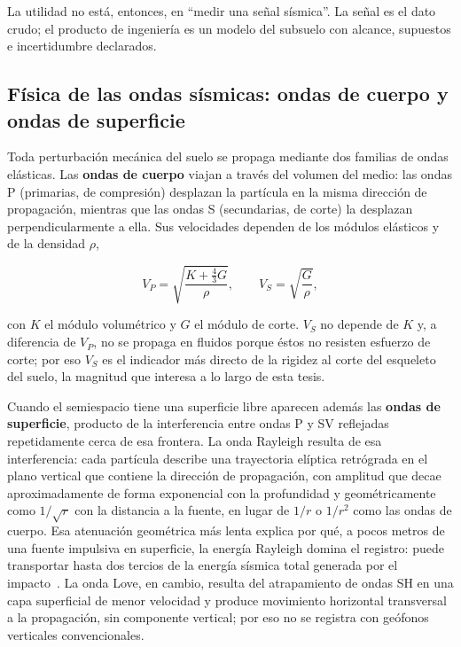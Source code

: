 La utilidad no está, entonces, en ``medir una señal sísmica''. La señal es el dato
crudo; el producto de ingeniería es un modelo del subsuelo con alcance, supuestos e
incertidumbre declarados.

\subsection{Física de las ondas sísmicas: ondas de cuerpo y ondas de superficie}

Toda perturbación mecánica del suelo se propaga mediante dos familias de ondas
elásticas. Las \textbf{ondas de cuerpo} viajan a través del volumen del medio: las ondas
P (primarias, de compresión) desplazan la partícula en la misma dirección de
propagación, mientras que las ondas S (secundarias, de corte) la desplazan
perpendicularmente a ella. Sus velocidades dependen de los módulos elásticos y de la
densidad $\rho$,

\begin{equation}
    V_P=\sqrt{\frac{K+\frac{4}{3}G}{\rho}},
    \qquad
    V_S=\sqrt{\frac{G}{\rho}},
\end{equation}

con $K$ el módulo volumétrico y $G$ el módulo de corte. $V_S$ no depende de $K$ y, a
diferencia de $V_P$, no se propaga en fluidos porque éstos no resisten esfuerzo de
corte; por eso $V_S$ es el indicador más directo de la rigidez al corte del esqueleto del
suelo, la magnitud que interesa a lo largo de esta tesis.

Cuando el semiespacio tiene una superficie libre aparecen además las \textbf{ondas de
superficie}, producto de la interferencia entre ondas P y SV reflejadas
repetidamente cerca de esa frontera. La onda Rayleigh resulta de esa interferencia: cada
partícula describe una trayectoria elíptica retrógrada en el plano vertical que contiene
la dirección de propagación, con amplitud que decae aproximadamente de forma exponencial
con la profundidad y geométricamente como $1/\sqrt{r}$ con la distancia a la fuente, en
lugar de $1/r$ o $1/r^2$ como las ondas de cuerpo. Esa atenuación geométrica más lenta
explica por qué, a pocos metros de una fuente impulsiva en superficie, la energía
Rayleigh domina el registro: puede transportar hasta dos tercios de la energía sísmica
total generada por el impacto~\cite{Foti2014,Kramer1996}. La onda Love, en cambio,
resulta del atrapamiento de ondas SH en una capa superficial de menor velocidad y
produce movimiento horizontal transversal a la propagación, sin componente vertical; por
eso no se registra con geófonos verticales convencionales.

